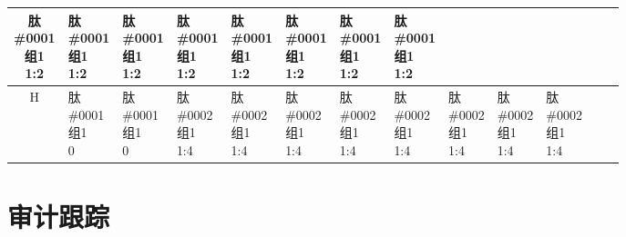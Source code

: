 \documentclass[UTF8,10pt,a4paper,fontset=fandol]{ctexart}
\begin{document}
\begin{center}
\begin{tabular}{c|*{12}{p{0.065\linewidth}|}}
\shortstack{肽\#0001\\组1\\1:2}&
\shortstack{肽\#0001\\组1\\1:2}&
\shortstack{肽\#0001\\组1\\1:2}&
\shortstack{肽\#0001\\组1\\1:2}&
\shortstack{肽\#0001\\组1\\1:2}&
\shortstack{肽\#0001\\组1\\1:2}&
\shortstack{肽\#0001\\组1\\1:2}&
\shortstack{肽\#0001\\组1\\1:2}& &\\ \hline
H&
\shortstack{肽\#0001\\组1\\0}&
\shortstack{肽\#0001\\组1\\0}&
\shortstack{肽\#0002\\组1\\1:4}&
\shortstack{肽\#0002\\组1\\1:4}&
\shortstack{肽\#0002\\组1\\1:4}&
\shortstack{肽\#0002\\组1\\1:4}&
\shortstack{肽\#0002\\组1\\1:4}&
\shortstack{肽\#0002\\组1\\1:4}&
\shortstack{肽\#0002\\组1\\1:4}&
\shortstack{肽\#0002\\组1\\1:4}& &\\ \hline
\end{tabular}
\end{center}

\medskip
\section*{审计跟踪}
\end{document}
